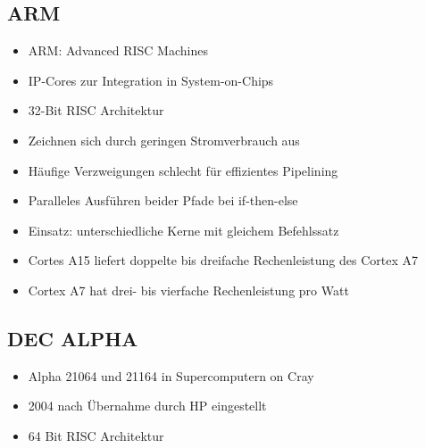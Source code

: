 \subsection{ARM}
\begin{itemize}
	\item ARM: Advanced RISC Machines
	\item IP-Cores zur Integration in System-on-Chips
	\item 32-Bit RISC Architektur
	\item Zeichnen sich durch geringen Stromverbrauch aus
	\item Häufige Verzweigungen schlecht für effizientes Pipelining
	\item Paralleles Ausführen beider Pfade bei if-then-else
	\item Einsatz: unterschiedliche Kerne mit gleichem Befehlssatz
	\item Cortes A15 liefert doppelte bis dreifache Rechenleistung des Cortex A7
	\item Cortex A7 hat drei- bis vierfache Rechenleistung pro Watt
\end{itemize}
\subsection{DEC ALPHA}
\begin{itemize}
	\item Alpha 21064 und 21164 in Supercomputern on Cray
	\item 2004 nach Übernahme durch HP eingestellt
	\item 64 Bit RISC Architektur
\end{itemize}